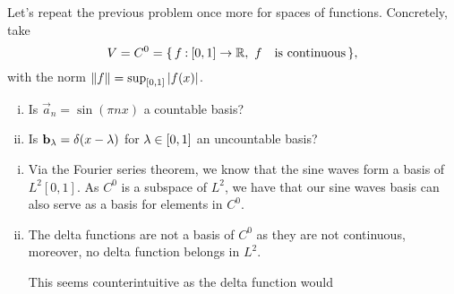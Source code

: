 \documentclass[12pt]{memoir}
\begin{document}
\begin{Ej}
    Let's repeat the previous problem once more for spaces of
functions. Concretely, take
$$V=C^0=\{\,f\mathbin{:}[0,1]\to \mathbb{R},\ f\quad\text{is continuous}\,\},$$
with the norm $\norm{f}=\sup_{\left\lbrack0,1\right\rbrack}|f(x)|$.
\begin{enumerate}[i)]
    \item Is $\vec a_n=\sin(\pi n x)$ a countable basis?
    \item Is $\mathbf{b}_\lambda=\delta(x-\lambda)$ for $\lambda\in\left\lbrack0,1\right\rbrack$ an uncountable basis? 
\end{enumerate}
\end{Ej}

\begin{ptcbr}
    \begin{enumerate}[i)]
        \item Via the Fourier series theorem, we know that the sine waves form a basis of $L^2[0,1]$. As $C^0$ is a subspace of $L^2$, we have that our sine waves basis can also serve as a basis for elements in $C^0$.
        \item The delta functions are not a basis of $C^0$ as they are not continuous, moreover, no delta function belongs in $L^2$. \par %
        This seems counterintuitive as the delta function would 
    \end{enumerate}
\end{ptcbr}
\end{document}
